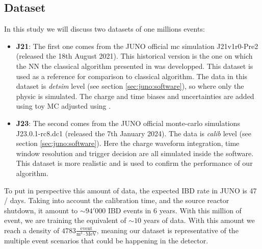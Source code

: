\subsection{Dataset}


In this study we will discuss two datasets of one millions events:
\begin{itemize}
  \item \textbf{J21}: The first one comes from the JUNO official mc simulation J21v1r0-Pre2 (released the 18th August 2021). This historical version is the one on which the NN the classical algorithm presented in \cite{lebrin_towards_2022} was developped. This dataset is used as a reference for comparison to classical algorithm. The data in this dataset is \textit{detsim} level (see section \ref{sec:juno:software}), so where only the physic is simulated. The charge and time biases and uncertainties are added using toy MC adjusted using \cite{cao_mass_2021, abusleme_mass_2022}.
  \item \textbf{J23}: The second comes from the JUNO official monte-carlo simulations J23.0.1-rc8.dc1 (released the 7th January 2024). The data is \textit{calib} level (see section \ref{sec:juno:software}). Here the charge waveform integration, time window resolution and trigger decision are all simulated inside the software. This dataset is more realistic and is used to confirm the performance of our algorithm.
\end{itemize}

To put in perspective this amount of data, the expected IBD rate in JUNO is 47 / days. Taking into account the calibration time, and the source reactor shutdown, it amount to $\sim 94'000$ IBD events in 6 years. With this million of event, we are training the equivalent of $\sim 10$ years of data. With this amount we reach a density of $4783 \frac{\mathrm{event}}{\mathrm{m}^3\cdot\mathrm{MeV}}$, meaning our dataset is representative of the multiple event scenarios that could be happening in the detector.

